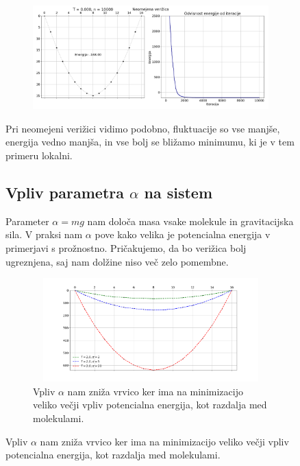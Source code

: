 \documentclass[11pt, a4paper]{article}
\begin{document}
\begin{figure}[H]
\begin{figure}[H]
\end{figure} 
\begin{figure}[H]

\centering
  \includegraphics[width=16cm, height=4cm]{neomejena_globina_T0.png}

\end{figure} 
Pri neomejeni verižici vidimo podobno, fluktuacije so vse manjše, energija vedno manjša, in vse bolj se bližamo minimumu, ki je v tem primeru lokalni.
\subsection{Vpliv parametra $\alpha$ na sistem}
Parameter $\alpha = mg$ nam določa masa vsake molekule in gravitacijska sila. V praksi nam $\alpha$ pove kako velika je potencialna energija v primerjavi s prožnostno. Pričakujemo, da bo verižica bolj ugreznjena, saj nam dolžine niso več zelo pomembne.
\begin{figure}[H]

\centering
  \includegraphics[width=10cm, height=4cm]{alfa.png}
\caption{Vpliv $\alpha$ nam zniža vrvico ker ima na minimizacijo veliko večji vpliv potencialna energija, kot razdalja med molekulami.}
\end{figure} 

\end{figure}
\end{document}
